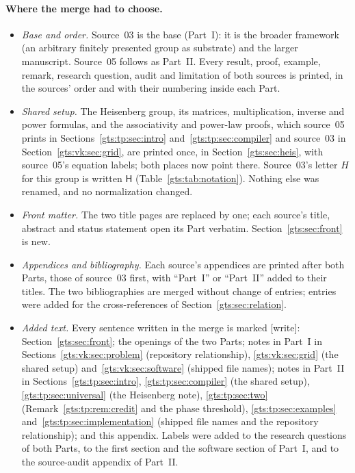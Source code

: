 \documentclass[11pt,letterpaper]{article}
\theoremstyle{definition}
\theoremstyle{remark}
\newcommand{\HH}{\mathsf H}
\newcommand{\wtag}{\textup{[write]}}
\begin{document}
\paragraph{Where the merge had to choose.}
\begin{itemize}
\item \emph{Base and order.} Source~03 is the base (Part~I): it is the broader framework (an arbitrary finitely presented group as substrate) and the larger manuscript. Source~05 follows as Part~II. Every result, proof, example, remark, research question, audit and limitation of both sources is printed, in the sources' order and with their numbering inside each Part.
\item \emph{Shared setup.} The Heisenberg group, its matrices, multiplication, inverse and power formulas, and the associativity and power-law proofs, which source~05 prints in Sections~\ref{gts:tp:sec:intro} and~\ref{gts:tp:sec:compiler} and source~03 in Section~\ref{gts:vk:sec:grid}, are printed once, in Section~\ref{gts:sec:heis}, with source~05's equation labels; both places now point there. Source~03's letter $H$ for this group is written $\HH$ (Table~\ref{gts:tab:notation}). Nothing else was renamed, and no normalization changed.
\item \emph{Front matter.} The two title pages are replaced by one; each source's title, abstract and status statement open its Part verbatim. Section~\ref{gts:sec:front} is new.
\item \emph{Appendices and bibliography.} Each source's appendices are printed after both Parts, those of source~03 first, with ``Part~I'' or ``Part~II'' added to their titles. The two bibliographies are merged without change of entries; entries~\cite{pqc,repo-comm,repo-unip,repo-heis} were added for the cross-references of Section~\ref{gts:sec:relation}.
\item \emph{Added text.} Every sentence written in the merge is marked \wtag: Section~\ref{gts:sec:front}; the openings of the two Parts; notes in Part~I in Sections~\ref{gts:vk:sec:problem} (repository relationship), \ref{gts:vk:sec:grid} (the shared setup) and~\ref{gts:vk:sec:software} (shipped file names); notes in Part~II in Sections~\ref{gts:tp:sec:intro}, \ref{gts:tp:sec:compiler} (the shared setup), \ref{gts:tp:sec:universal} (the Heisenberg note), \ref{gts:tp:sec:two} (Remark~\ref{gts:tp:rem:credit} and the phase threshold), \ref{gts:tp:sec:examples} and~\ref{gts:tp:sec:implementation} (shipped file names and the repository relationship); and this appendix. Labels were added to the research questions of both Parts, to the first section and the software section of Part~I, and to the source-audit appendix of Part~II.

\end{itemize}
\end{document}
